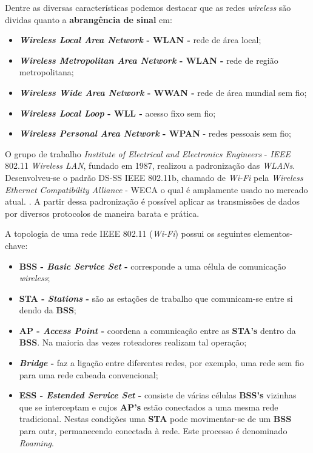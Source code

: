 Dentre as diversas características podemos destacar que as redes \textit{wireless} são dividas quanto a \textbf{abrangência de sinal} em:

\begin{itemize}
	\item \textbf{\textit{Wireless Local Area Network} - WLAN - } rede de área local;
	\item \textbf{\textit{Wireless Metropolitan Area Network} - WLAN - } rede de região metropolitana;
	\item \textbf{\textit{Wireless Wide Area Network} - WWAN - } rede de área mundial sem fio;
	\item \textbf{\textit{Wireless Local Loop} - WLL - } acesso fixo sem fio;
	\item \textbf{\textit{Wireless Personal Area Network} - WPAN} - redes pessoais sem fio;
\end{itemize}

O grupo de trabalho \textit{Institute of Electrical and Electronics Engineers} - \textit{IEEE} 802.11\textit{ Wireless LAN}, fundado em 1987, realizou a padronização das \textit{WLANs}. Desenvolveu-se o padrão DS-SS IEEE 802.11b, chamado de \textit{Wi-Fi} pela \textit{Wireless Ethernet Compatibility Alliance} - WECA o qual é amplamente usado no mercado atual. \cite{internetdascoisassemmisterios}. A partir dessa padronização é possível aplicar as transmissões de dados por diversos protocolos de maneira barata e prática.

A topologia de uma rede IEEE 802.11 (\textit{Wi-Fi})  possui os seguintes elementos-chave:

\begin{itemize}
	\item \textbf{BSS - \textit{Basic Service Set} -} corresponde a uma célula de comunicação \textit{wireless};
	\item \textbf{STA - \textit{Stations} -} são as estações de trabalho que comunicam-se entre si dendo da \textbf{BSS};
	\item \textbf{AP - \textit{Access Point} -} coordena a comunicação entre as \textbf{STA's} dentro da \textbf{BSS}. Na maioria das vezes roteadores realizam tal operação;
	\item \textbf{\textit{Bridge} -} faz a ligação entre diferentes redes, por exemplo, uma rede sem fio para uma rede cabeada convencional;
	\item  \textbf{ESS - \textit{Estended Service Set} -} consiste de várias células \textbf{BSS's} vizinhas que se interceptam e cujos \textbf{AP's} estão conectados a uma mesma rede tradicional. Nestas condições uma \textbf{STA} pode movimentar-se de um \textbf{BSS} para outr, permanecendo conectada à rede. Este processo é denominado \textit{Roaming}.
\end{itemize}

